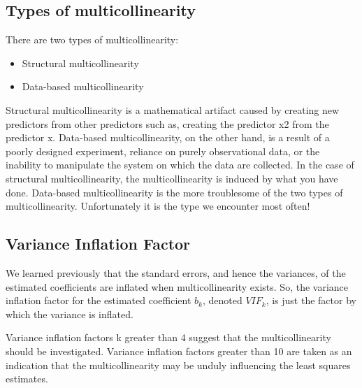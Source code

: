 \documentclass[a4paper,12pt]{article}
\begin{document}
\subsection{Types of multicollinearity}


There are two types of multicollinearity: 
\begin{itemize}
\item Structural multicollinearity
\item Data-based multicollinearity
\end{itemize}
Structural multicollinearity is a mathematical artifact caused by creating new predictors from other predictors  such as, creating the predictor x2 from the predictor x. 
Data-based multicollinearity, on the other hand, is a result of a poorly designed experiment, reliance on purely observational data, or the inability to manipulate the system on which the data are collected. 
In the case of structural multicollinearity, the multicollinearity is induced by what you have done. Data-based multicollinearity is the more troublesome of the two types of multicollinearity. Unfortunately it is the type we encounter most often!



\subsection{Variance Inflation Factor}



We learned previously that the standard errors, and hence the variances, of 
the estimated coefficients are inflated when multicollinearity exists. 
So, the variance inflation factor for the estimated coefficient $b_k$, denoted $VIF_k$, 
is just the factor by which the variance is inflated. 

Variance inflation factors k greater than 4 suggest that the multicollinearity should be investigated. 
Variance inflation factors greater than 10 are taken as an indication that the multicollinearity may be unduly influencing the least squares estimates. 
\end{document}
